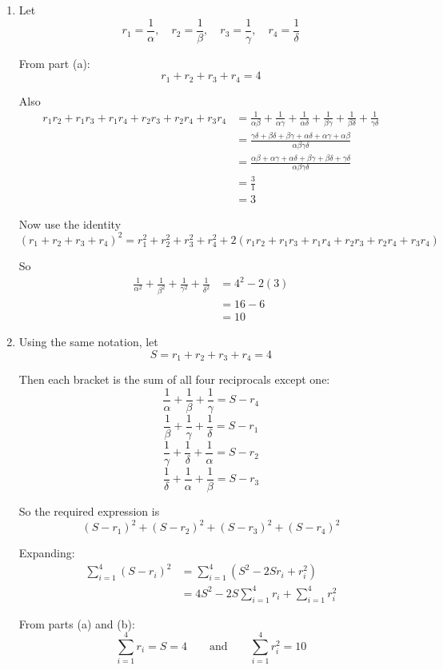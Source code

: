 \documentclass[leqno]{article}
\begin{document}
\begin{enumerate}[
  label=\textbf{\arabic*.},
  leftmargin=*,
  topsep=0pt,
  partopsep=0pt,
  parsep=0pt
]
\begin{djsSolution}
\begin{enumerate}[label=\textbf{(\alph*)}]
  \item Let
  \[
  r_1=\frac{1}{\alpha},\quad r_2=\frac{1}{\beta},\quad r_3=\frac{1}{\gamma},\quad r_4=\frac{1}{\delta}
  \]

  From part (a):
  \[
  r_1+r_2+r_3+r_4=4
  \]

  Also
  \begin{align*}
  r_1r_2+r_1r_3+r_1r_4+r_2r_3+r_2r_4+r_3r_4
  &=\frac{1}{\alpha\beta}+\frac{1}{\alpha\gamma}+\frac{1}{\alpha\delta}+\frac{1}{\beta\gamma}+\frac{1}{\beta\delta}+\frac{1}{\gamma\delta}\\
  &=\frac{\gamma\delta+\beta\delta+\beta\gamma+\alpha\delta+\alpha\gamma+\alpha\beta}{\alpha\beta\gamma\delta}\\
  &=\frac{\alpha\beta+\alpha\gamma+\alpha\delta+\beta\gamma+\beta\delta+\gamma\delta}{\alpha\beta\gamma\delta}\\
  &=\frac{3}{1}\\
  &=3
  \end{align*}

  Now use the identity
  \[
  (r_1+r_2+r_3+r_4)^2=r_1^2+r_2^2+r_3^2+r_4^2+2(r_1r_2+r_1r_3+r_1r_4+r_2r_3+r_2r_4+r_3r_4)
  \]

  So
  \begin{align*}
  \frac{1}{\alpha^2}+\frac{1}{\beta^2}+\frac{1}{\gamma^2}+\frac{1}{\delta^2}
  &=4^2-2(3)\\
  &=16-6\\
  &=10
  \end{align*}

  \item Using the same notation, let
  \[
  S=r_1+r_2+r_3+r_4=4
  \]

  Then each bracket is the sum of all four reciprocals except one:
  \[
  \frac{1}{\alpha}+\frac{1}{\beta}+\frac{1}{\gamma}=S-r_4
  \]
  \[
  \frac{1}{\beta}+\frac{1}{\gamma}+\frac{1}{\delta}=S-r_1
  \]
  \[
  \frac{1}{\gamma}+\frac{1}{\delta}+\frac{1}{\alpha}=S-r_2
  \]
  \[
  \frac{1}{\delta}+\frac{1}{\alpha}+\frac{1}{\beta}=S-r_3
  \]

  So the required expression is
  \[
  (S-r_1)^2+(S-r_2)^2+(S-r_3)^2+(S-r_4)^2
  \]

  Expanding:
  \begin{align*}
  \sum_{i=1}^4 (S-r_i)^2
  &=\sum_{i=1}^4 \left(S^2-2Sr_i+r_i^2\right)\\
  &=4S^2-2S\sum_{i=1}^4 r_i+\sum_{i=1}^4 r_i^2
  \end{align*}

  From parts (a) and (b):
  \[
  \sum_{i=1}^4 r_i=S=4
  \qquad\text{and}\qquad
  \sum_{i=1}^4 r_i^2=10
  \]


\end{enumerate}
\end{djsSolution}
\end{enumerate}
\end{document}
